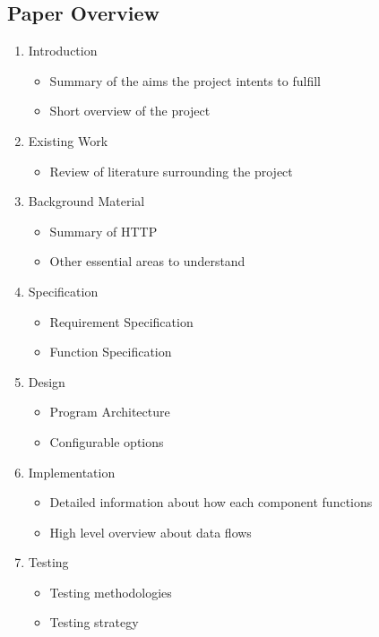\subsection{Paper Overview}
\begin{enumerate}
    \item Introduction
        \begin{itemize}
            \item Summary of the aims the project intents to fulfill
            \item Short overview of the project
        \end{itemize}
    \item Existing Work
        \begin{itemize}
            \item Review of literature surrounding the project
        \end{itemize}
    \item Background Material 
        \begin{itemize}
            \item Summary of HTTP
            \item Other essential areas to understand
        \end{itemize}
    \item Specification
        \begin{itemize}
            \item Requirement Specification
            \item Function Specification
        \end{itemize}
    \item Design
        \begin{itemize}
            \item Program Architecture
            \item Configurable options
        \end{itemize}
    \item Implementation
        \begin{itemize}
            \item Detailed information about how each component functions
            \item High level overview about data flows
        \end{itemize}
    \item Testing
        \begin{itemize}
            \item Testing methodologies
            \item Testing strategy

\end{itemize}
\end{enumerate}
